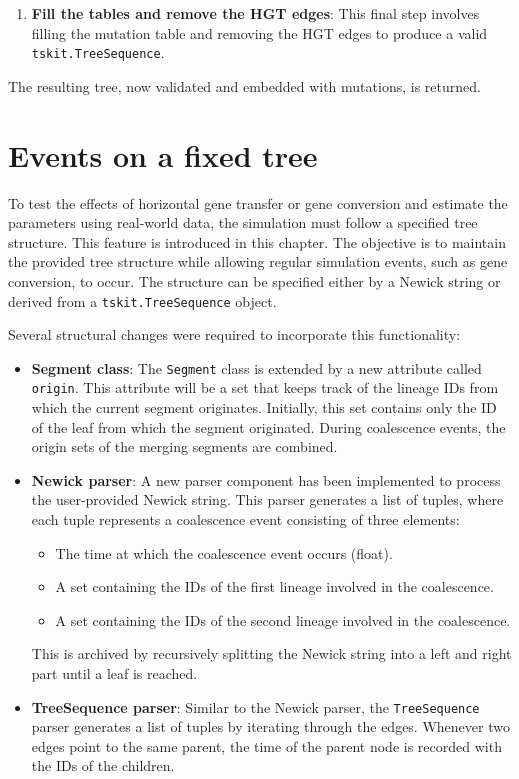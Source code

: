 \begin{enumerate}
    \item \textbf{Fill the tables and remove the HGT edges}: This final step involves filling the mutation table and removing the \ac{HGT} edges to produce a valid \texttt{tskit.TreeSequence}.
\end{enumerate}

The resulting tree, now validated and embedded with mutations, is returned.
\newpage
\section{Events on a fixed tree}
To test the effects of horizontal gene transfer or gene conversion and estimate the parameters using real-world data, the simulation must follow a specified tree structure.
This feature is introduced in this chapter.
The objective is to maintain the provided tree structure while allowing regular simulation events, such as gene conversion, to occur.
The structure can be specified either by a Newick string or derived from a \texttt{tskit.TreeSequence} object.

Several structural changes were required to incorporate this functionality:
\begin{itemize}
    \item \textbf{Segment class}: The  \texttt{Segment} class is extended by a new attribute called \texttt{origin}.
          This attribute will be a set that keeps track of the lineage IDs from which the current segment originates.
          Initially, this set contains only the ID of the leaf from which the segment originated.
          During coalescence events, the origin sets of the merging segments are combined.
    \item \textbf{Newick parser}: A new parser component has been implemented to process the user-provided Newick string.
          This parser generates a list of tuples, where each tuple represents a coalescence event consisting of three elements:
          \begin{itemize}
              \item The time at which the coalescence event occurs (float).
              \item A set containing the IDs of the first lineage involved in the coalescence.
              \item A set containing the IDs of the second lineage involved in the coalescence.
          \end{itemize}
          This is archived by recursively splitting the Newick string into a left and right part until a leaf is reached.
    \item \textbf{TreeSequence parser}: Similar to the Newick parser, the \texttt{TreeSequence} parser generates a list of tuples by iterating through the edges.
          Whenever two edges point to the same parent, the time of the parent node is recorded with the IDs of the children.

\end{itemize}

